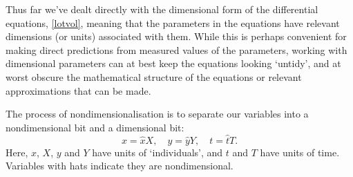 \documentclass[main.tex]{subfiles}
\begin{document}
Thus far we’ve dealt directly with the dimensional form of the differential equations, \cref{lotvol}, meaning that the parameters in the equations have relevant dimensions (or units) associated with them. While this is perhaps convenient for making direct predictions from measured values of the parameters, working with dimensional parameters can at best keep the equations looking `untidy’, and at worst obscure the mathematical structure of the equations or relevant approximations that can be made.

The process of nondimensionalisation is to separate our variables into a nondimensional bit and a dimensional bit:
\begin{equation}
x = \hat{x}X, \quad y = \hat{y}Y, \quad t = \hat{t}T.
\end{equation}
Here, $x$, $X$, $y$ and $Y$ have units of `individuals', and $t$ and $T$ have units of time. Variables with hats indicate they are nondimensional. 
\end{document}
